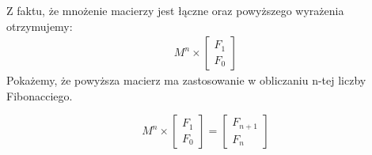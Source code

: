 Z faktu, że mnożenie macierzy jest łączne oraz powyższego wyrażenia otrzymujemy:
\begin{align*}
  M^n \times \begin{bmatrix}F_1 \\ F_0\end{bmatrix}
\end{align*}
Pokażemy, że powyższa macierz ma zastosowanie w obliczaniu n-tej liczby Fibonacciego.
\begin{lemma}
  \begin{equation*}
    M^{n} \times \begin{bmatrix}F_1 \\ F_0\end{bmatrix} = \begin{bmatrix}F_{n + 1} \\ F_{n}\end{bmatrix}
  \end{equation*}
\end{lemma}

